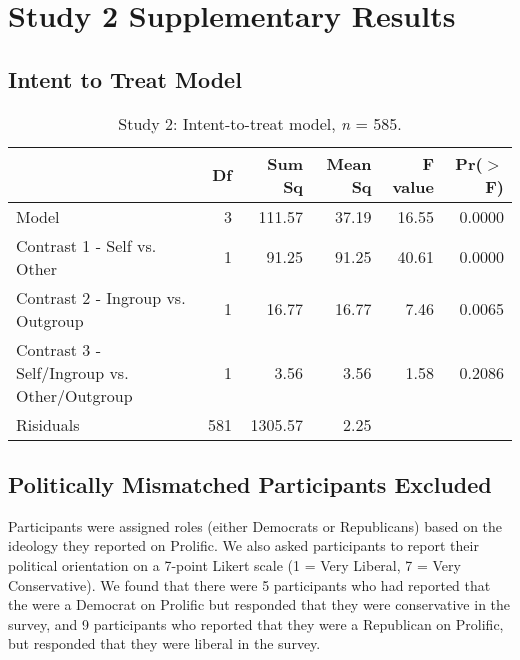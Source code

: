 \documentclass[12pt,]{article}
\begin{document}
\newpage
\section{Study 2 Supplementary Results}
\label{appendix:study2}


\subsection{Intent to Treat Model}
\label{appendix:itt2}


\begin{table}[ht]
\centering
\begin{tabular}{lrrrrr}
  \hline
 & Df & Sum Sq & Mean Sq & F value & Pr($>$F) \\ 
  \hline
Model & 3 & 111.57 & 37.19 & 16.55 & 0.0000 \\ 
  Contrast 1 - Self vs. Other & 1 & 91.25 & 91.25 & 40.61 & 0.0000 \\ 
  Contrast 2 - Ingroup vs. Outgroup & 1 & 16.77 & 16.77 & 7.46 & 0.0065 \\ 
  Contrast 3 - Self/Ingroup vs. Other/Outgroup & 1 & 3.56 & 3.56 & 1.58 & 0.2086 \\ 
  Risiduals & 581 & 1305.57 & 2.25 &  &  \\ 
   \hline
\end{tabular}
\caption{Study 2: Intent-to-treat model, \emph{n} = 585. } 
\label{ITT2}
\end{table}



\newpage
\subsection{Politically Mismatched Participants Excluded}
\label{appendix:mismatch}

Participants were assigned roles (either Democrats or Republicans) based on the ideology they reported on Prolific. We also asked participants to report their political orientation on a 7-point Likert scale (1 = Very Liberal, 7 = Very Conservative). We found that there were 5 participants who had reported that the were a Democrat on Prolific but responded that they were conservative in the survey, and 9 participants who reported that they were a Republican on Prolific, but responded that they were liberal in the survey. 
\end{document}
